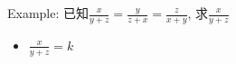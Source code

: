 \clearpage
Example: 已知$\frac{x}{y+z}=\frac{y}{z+x}=\frac{z}{x+y}$, 求$\frac{x}{y+z}$  
\clearpage
\begin{itemize}
\item $\frac{x}{y+z}=k$
\end{itemize}



